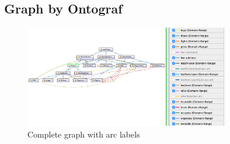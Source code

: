 \documentclass[a4paper]{article}
\begin{document}
\begin{appendix}
	\section{Graph by Ontograf}
	\label{appendix:ontograf_graph}
	\begin{figure}[H]
		\centering
		\includegraphics[width=0.8\textwidth]{resources/ontograf.png}
		\caption{Complete graph with arc labels}
		\label{fig:ontograf}
	\end{figure}
\end{appendix}
\end{document}
